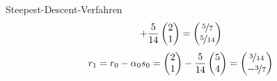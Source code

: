 \begin{example}{Steepest-Descent-Verfahren}
\[        + \frac{5}{14}
        \begin{pmatrix}
            2 \\ 1
        \end{pmatrix}
        =
        \begin{pmatrix}
            \nicefrac{5}{7} \\ \nicefrac{5}{14}
        \end{pmatrix}
    \]
    \[
        r_{1} = r_0 - \alpha_0 s_0 =
        \begin{pmatrix}
            2 \\ 1
        \end{pmatrix}
        - \frac{5}{14}
        \begin{pmatrix}
            5 \\ 4
        \end{pmatrix}
        = \begin{pmatrix}
            \nicefrac{3}{14} \\ -\nicefrac{3}{7}
        \end{pmatrix}
    \]


\end{example}
